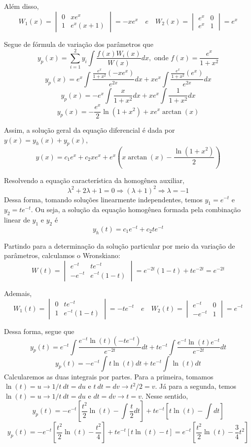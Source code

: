 \documentclass[oneside,12pt,a4paper]{report}
\begin{document}
\begin{resolucao}
    Além disso,
    \[W_1(x)=\begin{vmatrix}
        0 & xe^{x}\\
        1 & e^{x}(x+1)
    \end{vmatrix}=-xe^{x}\quad e \quad W_2(x)=\begin{vmatrix}
        e^{x}  & 0\\
        e^{x} & 1
    \end{vmatrix}=e^{x}\]

    Segue de fórmula de variação dos parâmetros que
    \[y_p(x)=\sum_{i=1}^{2}y_i\int\frac{f(x)W_i(x)}{W(x)}dx, \text{ onde } f(x)=\frac{e^{x}}{1+x^2}\]
    \[y_p(x)=e^x\int\frac{\frac{e^x}{1+x^2}(-xe^x)}{e^{2x}}dx+xe^x\int\frac{\frac{e^x}{1+x^2}(e^x)}{e^{2x}}dx\]
    \[y_p(x)=-e^x\int\frac{x}{1+x^2}dx+xe^x\int\frac{1}{1+x^2}dx\]
    \[y_p(x)=-\frac{e^x}{2}\ln(1+x^2)+xe^x\arctan(x)\]

    Assim, a solução geral da equação diferencial é dada por $y(x)=y_h(x)+y_p(x)$,
    \[\boxed{y(x)=c_1e^x+c_2xe^x+e^x\left(x\arctan(x)-\frac{\ln(1+x^2)}{2}\right)}\]

    \itemresolucao Resolvendo a equação característica da homogênea auxiliar,
    \[\lambda^2+2\lambda+1=0\Rightarrow(\lambda+1)^2\Rightarrow\lambda=-1\]
    Dessa forma, tomando soluções linearmente independentes, temos $y_1=e^{-t}$ e $y_2=te^{-t}$. Ou seja, a solução da equação homogênea formada pela combinação linear de $y_1$ e $y_2$ é
    \[y_h(t)=c_1e^{-t}+c_2te^{-t}\]

    Partindo para a determinação da solução particular por meio da variação de parâmetros, calculamos o Wronskiano:
    \[W(t)=\begin{vmatrix}
        e^{-t} & te^{-t}\\
        -e^{-t} & e^{-t}(1-t)
    \end{vmatrix}=e^{-2t}(1-t)+te^{-2t}=e^{-2t}\]

    Ademais,
    \[W_1(t)=\begin{vmatrix}
        0 & te^{-t}\\
        1 & e^{-t}(1-t)
    \end{vmatrix}=-te^{-t}\quad e \quad W_2(t)=\begin{vmatrix}
        e^{-t}   & 0\\
        -e^{-t} & 1
    \end{vmatrix}=e^{-t}\]

    Dessa forma, segue que
    \[y_p(t)=e^{-t}\int\frac{e^{-t}\ln(t)(-te^{-t})}{e^{-2t}}dt+te^{-t}\int\frac{e^{-t}\ln(t)e^{-t}}{e^{-2t}}dt\]
    \[y_p(t)=-e^{-t}\int t\ln(t)dt+te^{-t}\int\ln(t)dt\]
    Calcularemos as duas integrais por partes. Para a primeira, tomamos $\ln(t)=u\rightarrow1/t~dt=du$ e $t~dt=dv\rightarrow t^2/2=v$. Já para a segunda, temos $\ln(t)=u\rightarrow1/t~dt=du$ e $dt=dv\rightarrow t=v$. Nesse sentido,
    \[y_p(t)=-e^{-t}\left[\frac{t^2}{2}\ln(t)-\int\frac{t}{2}dt\right]+te^{-t}\left[t\ln(t)-\int dt\right]\]
    \[y_p(t)=-e^{-t}\left[\frac{t^2}{2}\ln(t)-\frac{t^2}{4}\right]+te^{-t}\left[t\ln(t)-t\right]=e^{-t}\left[\frac{t^2}{2}\ln(t)-\frac{3}{4}t^2\right]\]


\end{resolucao}
\end{document}
